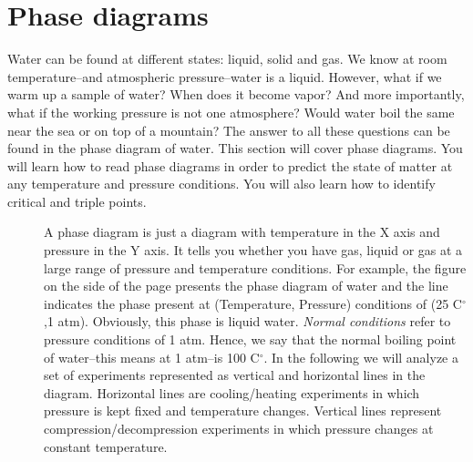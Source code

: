 \documentclass[main.tex]{subfiles}
\begin{document}
\section{Phase diagrams}
Water can be found at different states: liquid, solid and gas. We know at room temperature--and atmospheric pressure--water is a liquid. However, what if we warm up a sample of water? When does it become vapor? And more importantly, what if the working pressure is not one atmosphere? Would water boil the same near the sea or on top of a mountain? The answer to all these questions can be found in the phase diagram of water. This section will cover phase diagrams. You will learn how to read phase diagrams in order to predict the state of matter at any temperature and pressure conditions. You will also learn how to identify critical and triple points.
\sloppy 
\begin{description}
\item[] A phase diagram is just a diagram with temperature in the X axis and pressure in the Y axis. It tells you whether you have gas, liquid or gas at a large range of pressure and temperature conditions. For example, the figure on the side of the page presents the phase diagram of water and the line indicates the phase present at (Temperature, Pressure) conditions of (25 C$^{\circ}$,1 atm). Obviously, this phase is liquid water. \emph{Normal conditions} refer to pressure conditions of 1 atm. Hence, we say that the normal boiling point of water--this means at 1 atm--is 100 C$^{\circ}$. In the following we will analyze a set of experiments represented as vertical and horizontal lines in the diagram. Horizontal lines are cooling/heating experiments in which pressure is kept fixed and temperature changes. Vertical lines represent compression/decompression experiments in which pressure changes at constant temperature.




\end{description}
\end{document}
